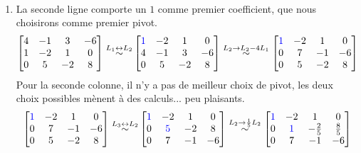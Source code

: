 \begin{exercice}
\, 
\begin{enumerate}
    \item La seconde ligne comporte un $1$ comme premier coefficient, que nous choisirons comme premier pivot.
    \begin{align*}
        \begin{bmatrix}
        4 & -1 & 3 & -6\\
        1 & -2 & 1 & 0\\
        0 & 5 & -2 & 8
        \end{bmatrix} 
        \overset{L_1 \leftrightarrow L_2}{\sim}
        &\begin{bmatrix}
        \color{blue}1 & -2 & 1 & 0\\
        4 & -1 & 3 & -6\\
        0 & 5 & -2 & 8
        \end{bmatrix}
        \overset{L_2 \to L_2 - 4L_1}{\sim}
        \begin{bmatrix}
        \color{blue}1 & -2 & 1 & 0\\
        0 & 7 & -1 & -6\\
        0 & 5 & -2 & 8
        \end{bmatrix}
    \end{align*}
    \noindent Pour la seconde colonne, il n'y a pas de meilleur choix de pivot, les deux choix possibles mènent à des calculs... peu plaisants.
    \begin{align*}
        \begin{bmatrix}
        \color{blue}1 & -2 & 1 & 0\\
        0 & 7 & -1 & -6\\
        0 & 5 & -2 & 8
        \end{bmatrix}
        \overset{L_3 \leftrightarrow L_2}{\sim}
        &\begin{bmatrix}
        \color{blue}1 & -2 & 1 & 0\\
        0 & \color{blue}5 & -2 & 8\\
        0 & 7 & -1 & -6
        \end{bmatrix}
        \overset{L_2 \to \frac{1}{5}L_2}{\sim}
        \begin{bmatrix}
        \color{blue}1 & -2 & 1 & 0\\
        0 & \color{blue}1 & -\frac{2}{5} & \frac{8}{5}\\
        0 & 7 & -1 & -6
        \end{bmatrix}\\

\end{align*}
\end{enumerate}
\end{exercice}
